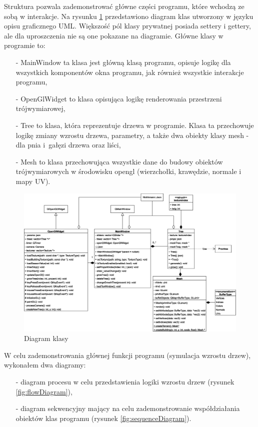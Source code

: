\documentclass[a4paper,twoside,12pt]{report}
\begin{document}
Struktura pozwala zademonstrować główne części programu, 
które wchodzą ze sobą w interakcje. Na rysunku \ref{fig:classDiagram} 
przedstawiono diagram klas utworzony w języku opisu graficznego UML. 
Większość pól klasy prywatnej posiada settery i gettery, 
ale dla uproszczenia nie są one pokazane na diagramie. 
Główne klasy w programie to:
\begin{itemize}
	\item[-] MainWindow ta klasa jest główną klasą programu, opisuje logikę dla wszystkich komponentów okna programu, jak również wszystkie interakcje programu,
	\item[-] OpenGlWidget to klasa opisująca logikę renderowania przestrzeni trójwymiarowej,
	\item[-] Tree to klasa, która reprezentuje drzewa w programie. Klasa ta przechowuje logikę zmiany wzrostu drzewa, parametry, a także dwa obiekty klasy mesh - dla pnia i~gałęzi drzewa oraz liści,
	\item[-] Mesh to klasa przechowująca wszystkie dane do budowy obiektów trójwymiarowych w środowisku opengl (wierzchołki, krawędzie, normale i mapy UV).
\end{itemize}

\begin{figure}[H]
	\centering\includegraphics[width=15.5cm]{grafika/diagrams/class}
	\caption{Diagram klasy}
    \label{fig:classDiagram}
\end{figure}

W celu zademonstrowania głównej funkcji programu 
(symulacja wzrostu drzew), wykonałem dwa diagramy: 
\begin{itemize}[noitemsep,topsep=0pt]
	\item[-] diagram procesu w celu przedstawienia logiki wzrostu drzew (rysunek \ref{fig:flowDiagram}),
	\item[-] diagram sekwencyjny mający na celu zademonstrowanie współdziałania obiektów klas programu (rysunek \ref{fig:sequenceDiagram}).
\end{itemize}
\end{document}
